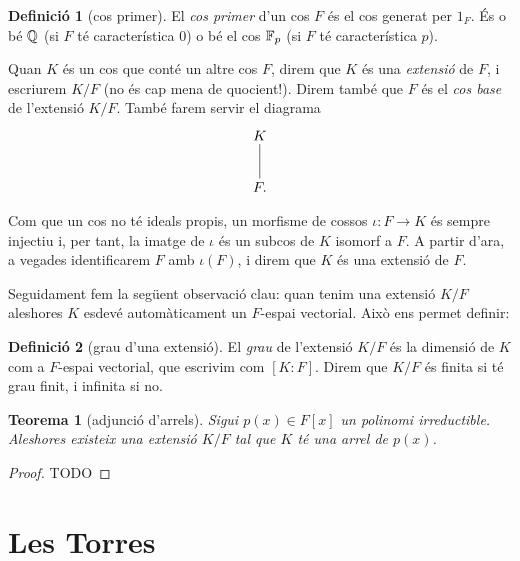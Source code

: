 \documentclass[
]{book}
\newtheorem{theorem}{Teorema}[chapter]
\theoremstyle{definition}
\newtheorem{definition}{Definició}[chapter]
\theoremstyle{definition}
\theoremstyle{definition}
\theoremstyle{definition}
\theoremstyle{remark}
\begin{document}
\begin{definition}[cos primer]
\protect\hypertarget{def:cos-primer}{}\label{def:cos-primer}El \emph{cos primer} d'un cos \(F\) és el cos generat per \(1_F\). És o bé \(\mathbb{Q}\) (si \(F\) té característica \(0\)) o bé el cos \(\mathbb{F}_p\)
(si \(F\) té característica \(p\)).
\end{definition}

Quan \(K\) és un cos que conté un altre cos \(F\), direm que \(K\) és una \emph{extensió} de \(F\), i escriurem \(K/F\) (no és cap mena de quocient!). Direm també que
\(F\) és el \emph{cos base} de l'extensió \(K/F\). També farem servir
el diagrama
\[
\begin{xy}
\xymatrix{
  K\ar@{-}[d]\\
  F.
}
\end{xy}
\]

Com que un cos no té ideals propis, un morfisme de cossos \(\iota\colon F\to K\) és sempre injectiu i, per tant, la
imatge de \(\iota\) és un subcos de \(K\) isomorf a \(F\). A partir d'ara, a vegades identificarem \(F\) amb \(\iota(F)\), i direm
que \(K\) és una extensió de \(F\).

Seguidament fem la següent observació clau: quan tenim una extensió \(K/F\) aleshores \(K\) esdevé automàticament un \(F\)-espai vectorial. Això
ens permet definir:

\begin{definition}[grau d'una extensió]
\protect\hypertarget{def:grau-ext}{}\label{def:grau-ext}El \emph{grau} de l'extensió \(K/F\) és la dimensió de \(K\) com a \(F\)-espai vectorial, que escrivim com \([K\colon F]\). Direm que \(K/F\) és finita si té grau finit,
i infinita si no.
\end{definition}

\begin{theorem}[adjunció d'arrels]
\protect\hypertarget{thm:ext-arrel}{}\label{thm:ext-arrel}Sigui \(p(x)\in F[x]\) un polinomi irreductible. Aleshores existeix una extensió \(K/F\) tal que \(K\) té una arrel de \(p(x)\).
\end{theorem}

\begin{proof}
TODO
\end{proof}

\hypertarget{les-torres}{%
\chapter{Les Torres}\label{les-torres}}
\end{document}
